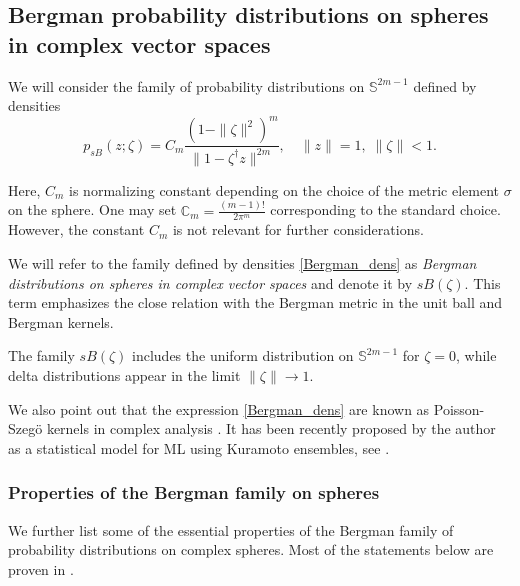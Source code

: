 \documentclass{article}
\theoremstyle{plain}%
\theoremstyle{definition}
\theoremstyle{remark}
\theoremstyle{prop}
\begin{document}
\subsection{Bergman probability distributions on spheres in complex vector spaces}

We will consider the family of probability distributions on ${\mathbb S}^{2m-1}$ defined by densities 
\begin{equation}
\label{Bergman_dens}
p_{sB}(z;\zeta) = C_m \frac{(1-\| \zeta \|^2)^m}{\|1 - \zeta^\dagger z \|^{2m}}, \quad \| z \| = 1, \; \| \zeta \| <1.
\end{equation}

Here, $C_m$ is normalizing constant depending on the choice of the metric element $\sigma$ on the sphere. One may set $\mathbb C_m = \frac{(m-1)!}{2 \pi^m}$ corresponding to the standard choice. However, the constant $C_m$ is not relevant for further considerations.

We will refer to the family defined by densities \eqref{Bergman_dens} as {\it Bergman distributions on spheres in complex vector spaces} and denote it by $sB(\zeta)$. This term emphasizes the close relation with the Bergman metric in the unit ball and Bergman kernels. 

The family $sB(\zeta)$ includes the uniform distribution on $\mathbb S^{2m-1}$ for $\zeta = 0$, while delta distributions appear in the limit $\| \zeta \| \to 1$.

We also point out that the expression \eqref{Bergman_dens} are known as Poisson-Szeg\" o kernels in complex analysis \cite{Krantz}. It has been recently proposed by the author as a statistical model for ML using Kuramoto ensembles, see \cite{JH}.

\subsubsection{Properties of the Bergman family on spheres}

We further list some of the essential properties of the Bergman family of probability distributions on complex spheres. Most of the statements below are proven in \cite{JK2}.
\end{document}
